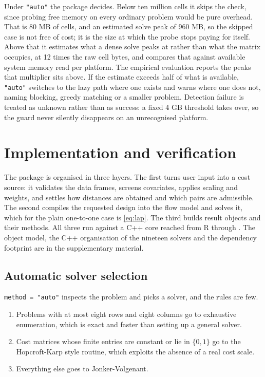 Under \texttt{"auto"} the package decides. Below ten million cells it skips the
check, since probing free memory on every ordinary problem would be pure
overhead. That is 80 MB of cells, and an estimated solve peak of
960 MB, so the skipped case is
not free of cost; it is the size at which the probe stops paying for
itself. Above that it estimates what a dense solve peaks at
rather than what the matrix occupies, at 12 times the raw cell
bytes, and compares that against available system memory read per platform.
The empirical evaluation reports the peaks that multiplier sits above. If the
estimate exceeds half of what is available, \texttt{"auto"} switches to the lazy path
where one exists and warns where
one does not, naming blocking, greedy matching or a smaller problem. Detection
failure is treated as unknown rather than as success: a fixed 4 GB threshold
takes over, so the guard never silently disappears on an unrecognised
platform.

\section{Implementation and verification}\label{implementation-and-verification}

The package is organised in three layers. The first turns user input into a
cost source: it validates the data frames, screens covariates, applies scaling
and weights, and settles how distances are obtained and which pairs are
admissible. The second compiles the requested design into the flow model and
solves it, which for the plain one-to-one case is \eqref{eq:lap}. The third
builds result objects and their methods. All three run against a C++ core
reached from R through  \citep{Rcpp}. The object model, the C++
organisation of the nineteen solvers and the dependency footprint are in the
supplementary material.

\subsection{Automatic solver selection}\label{automatic-solver-selection}

\texttt{method\ =\ "auto"} inspects the problem and picks a solver, and the rules are
few.

\begin{enumerate}
\def\labelenumi{\arabic{enumi}.}
\tightlist
\item
  Problems with at most eight rows and eight columns go to exhaustive
  enumeration, which is exact and faster than setting up a general solver.
\item
  Cost matrices whose finite entries are constant or lie in \(\{0, 1\}\) go to
  the Hopcroft-Karp style routine, which exploits the absence of a real cost
  scale.
\item
  Everything else goes to Jonker-Volgenant.
\end{enumerate}

